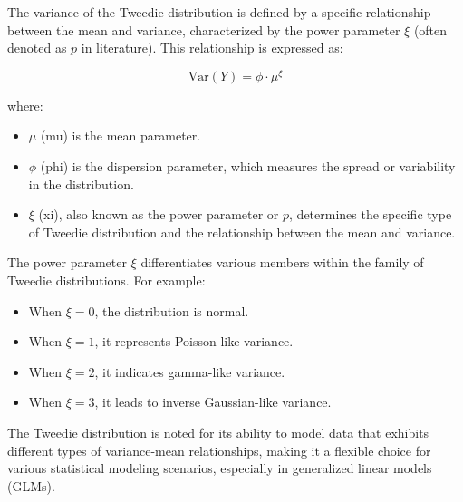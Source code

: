 \documentclass[12pt, twoside,hidelinks]{article}
\theoremstyle{definition}
\numberwithin{equation}{section}
\begin{document}
The variance of the Tweedie distribution is defined by a specific relationship between the mean and variance, characterized by the power parameter \( \xi \) (often denoted as \( p \) in literature). This relationship is expressed as:

\begin{equation}
    \text{Var}(Y) = \phi \cdot \mu^\xi
\end{equation}

where:
\begin{itemize}
    \item \( \mu \) (mu) is the mean parameter.
    \item \( \phi \) (phi) is the dispersion parameter, which measures the spread or variability in the distribution.
    \item \( \xi \) (xi), also known as the power parameter or \( p \), determines the specific type of Tweedie distribution and the relationship between the mean and variance.
\end{itemize}

The power parameter \( \xi \) differentiates various members within the family of Tweedie distributions. For example:
\begin{itemize}
    \item When \( \xi = 0 \), the distribution is normal.
    \item When \( \xi = 1 \), it represents Poisson-like variance.
    \item When \( \xi = 2 \), it indicates gamma-like variance.
    \item When \( \xi = 3 \), it leads to inverse Gaussian-like variance.
\end{itemize}

The Tweedie distribution is noted for its ability to model data that exhibits different types of variance-mean relationships, making it a flexible choice for various statistical modeling scenarios, especially in generalized linear models (GLMs).






\end{document}
